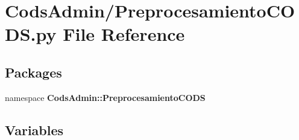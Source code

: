 \section{\-Cods\-Admin/\-Preprocesamiento\-C\-O\-D\-S.py \-File \-Reference}
\label{_preprocesamiento_c_o_d_s_8py}
\subsection*{\-Packages}
\begin{DoxyCompactItemize}
\item 
namespace {\bf \-Cods\-Admin\-::\-Preprocesamiento\-C\-O\-D\-S}
\end{DoxyCompactItemize}
\subsection*{\-Variables}
